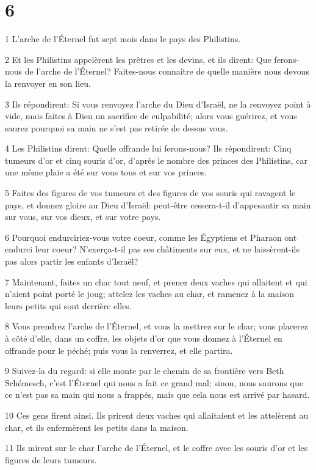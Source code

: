 \chapter{6}

\par 1 L'arche de l'Éternel fut sept mois dans le pays des Philistins.
\par 2 Et les Philistins appelèrent les prêtres et les devins, et ils dirent: Que ferons-nous de l'arche de l'Éternel? Faites-nous connaître de quelle manière nous devons la renvoyer en son lieu.
\par 3 Ils répondirent: Si vous renvoyez l'arche du Dieu d'Israël, ne la renvoyez point à vide, mais faites à Dieu un sacrifice de culpabilité; alors vous guérirez, et vous saurez pourquoi sa main ne s'est pas retirée de dessus vous.
\par 4 Les Philistins dirent: Quelle offrande lui ferons-nous? Ils répondirent: Cinq tumeurs d'or et cinq souris d'or, d'après le nombre des princes des Philistins, car une même plaie a été sur vous tous et sur vos princes.
\par 5 Faites des figures de vos tumeurs et des figures de vos souris qui ravagent le pays, et donnez gloire au Dieu d'Israël: peut-être cessera-t-il d'appesantir sa main sur vous, sur vos dieux, et sur votre pays.
\par 6 Pourquoi endurciriez-vous votre coeur, comme les Égyptiens et Pharaon ont endurci leur coeur? N'exerça-t-il pas ses châtiments sur eux, et ne laissèrent-ils pas alors partir les enfants d'Israël?
\par 7 Maintenant, faites un char tout neuf, et prenez deux vaches qui allaitent et qui n'aient point porté le joug; attelez les vaches au char, et ramenez à la maison leurs petits qui sont derrière elles.
\par 8 Vous prendrez l'arche de l'Éternel, et vous la mettrez sur le char; vous placerez à côté d'elle, dans un coffre, les objets d'or que vous donnez à l'Éternel en offrande pour le péché; puis vous la renverrez, et elle partira.
\par 9 Suivez-la du regard: si elle monte par le chemin de sa frontière vers Beth Schémesch, c'est l'Éternel qui nous a fait ce grand mal; sinon, nous saurons que ce n'est pas sa main qui nous a frappés, mais que cela nous est arrivé par hasard.
\par 10 Ces gens firent ainsi. Ils prirent deux vaches qui allaitaient et les attelèrent au char, et ils enfermèrent les petits dans la maison.
\par 11 Ils mirent sur le char l'arche de l'Éternel, et le coffre avec les souris d'or et les figures de leurs tumeurs.
